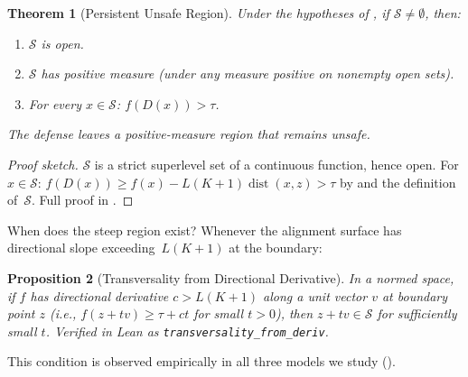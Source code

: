 \documentclass[11pt]{article}
\newtheorem{theorem}{Theorem}[section]
\newtheorem{proposition}[theorem]{Proposition}
\newcommand{\dist}{\operatorname{dist}}
\begin{document}
\begin{theorem}[Persistent Unsafe Region]
\label{thm:persistent}
Under the hypotheses of , if $\mathcal{S} \neq
\emptyset$, then:
\begin{enumerate}[nosep]
  \item $\mathcal{S}$ is open.
  \item $\mathcal{S}$ has positive measure (under any measure positive
    on nonempty open sets).
  \item For every $x \in \mathcal{S}$: $f(D(x)) > \tau$.
\end{enumerate}
The defense leaves a positive-measure region that remains unsafe.
\end{theorem}

\begin{proof}[Proof sketch]
$\mathcal{S}$ is a strict superlevel set of a continuous function,
hence open. For $x \in \mathcal{S}$:
$f(D(x)) \geq f(x) - L(K{+}1)\dist(x,z) > \tau$
by  and the definition of~$\mathcal{S}$.
Full proof in .
\end{proof}

When does the steep region exist? Whenever the alignment surface has
directional slope exceeding~$L(K{+}1)$ at the boundary:

\begin{proposition}[Transversality from Directional Derivative]
\label{prop:transversality}
In a normed space, if $f$ has directional derivative $c > L(K{+}1)$
along a unit vector $v$ at boundary point $z$ (i.e.,
$f(z + tv) \geq \tau + ct$ for small $t > 0$), then
$z + tv \in \mathcal{S}$ for sufficiently small $t$.
Verified in Lean as \texttt{transversality\_from\_deriv}.
\end{proposition}

This condition is observed empirically in all three models we study
().
\end{document}

